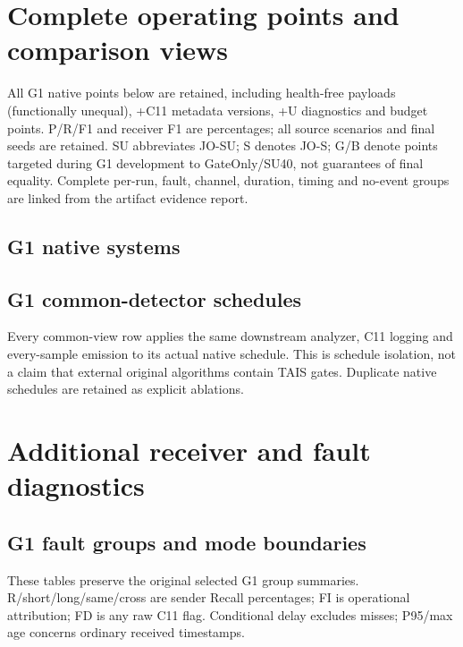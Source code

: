 \documentclass[10pt]{article}
\begin{document}
\section{Complete operating points and comparison views}\label{app:complete}
All G1 native points below are retained, including health-free payloads (functionally unequal), +C11 metadata versions, +U diagnostics and budget points. P/R/F1 and receiver F1 are percentages; all source scenarios and final seeds are retained. SU abbreviates JO-SU; S denotes JO-S; G/B denote points targeted during G1 development to GateOnly/SU40, not guarantees of final equality. Complete per-run, fault, channel, duration, timing and no-event groups are linked from the artifact evidence report.
\subsection{G1 native systems}

\subsection{G1 common-detector schedules}
Every common-view row applies the same downstream analyzer, C11 logging and every-sample emission to its actual native schedule. This is schedule isolation, not a claim that external original algorithms contain TAIS gates. Duplicate native schedules are retained as explicit ablations.


\clearpage
\section{Additional receiver and fault diagnostics}\label{app:diagnostics}
\subsection{G1 fault groups and mode boundaries}
These tables preserve the original selected G1 group summaries. R/short/long/same/cross are sender Recall percentages; FI is operational attribution; FD is any raw C11 flag. Conditional delay excludes misses; P95/max age concerns ordinary received timestamps.
\begin{table}[htbp]\centering\small\caption{Retained G1 fault-class summaries.}
\label{tab:faults}\end{table}
\begin{table}[htbp]\centering\small\caption{G1 event/health boundaries and receiver age.}
\label{tab:boundaries}\end{table}
\begin{table}[htbp]\centering\small\caption{G1 communication diagnostics, including public U on independent schedules. E/H denote event/health sampled edges; missing edges and lag are separate outcomes.}
\label{tab:communication}\end{table}
\clearpage
\end{document}

